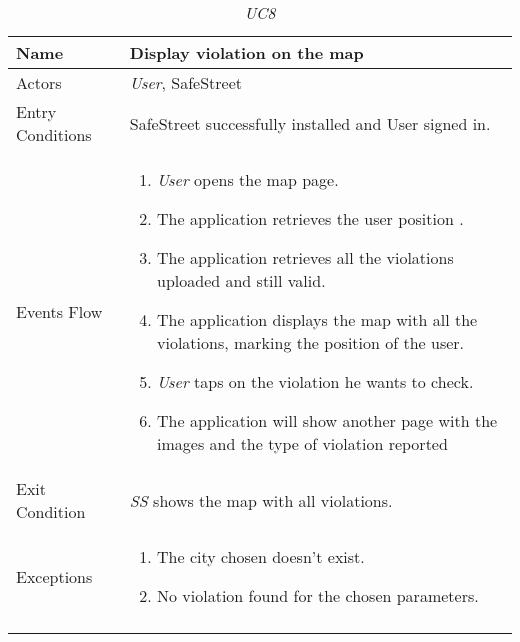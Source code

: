 \documentclass[../../../RASD.tex]{subfiles}
\begin{document}
    \begin{center}
        \begin{longtable}{| p{.35\linewidth} | p{.65\linewidth} |}
            \hline
            \textbf{Name} & \textbf{Display violation on the map}\\ \hline
            Actors & \textit{User}, SafeStreet\\ \hline
            Entry Conditions & SafeStreet successfully installed and User signed in.\\ \hline
            Events Flow &
            \begin{enumerate}
                \item \textit{User} opens the map page.
                \item  The application retrieves the user position .
                \item  The application retrieves all the violations uploaded and still valid.
                \item  The application displays the map with all the violations, marking the position of the user.
                \item \textit{User} taps on the violation he wants to check.
                \item The application will show another page with the images and the type of violation reported
            \end{enumerate}
            \\ \hline
            Exit Condition & \textit{SS} shows the map with all violations.\\ \hline
            Exceptions &
            \begin{enumerate}
                \item The city chosen doesn’t exist.
                \item No violation found for the chosen parameters.
            \end{enumerate}
            \\
            \hline
            \caption{\textit{UC8}}
        \end{longtable}
    \end{center}
    \newpage
\end{document}
